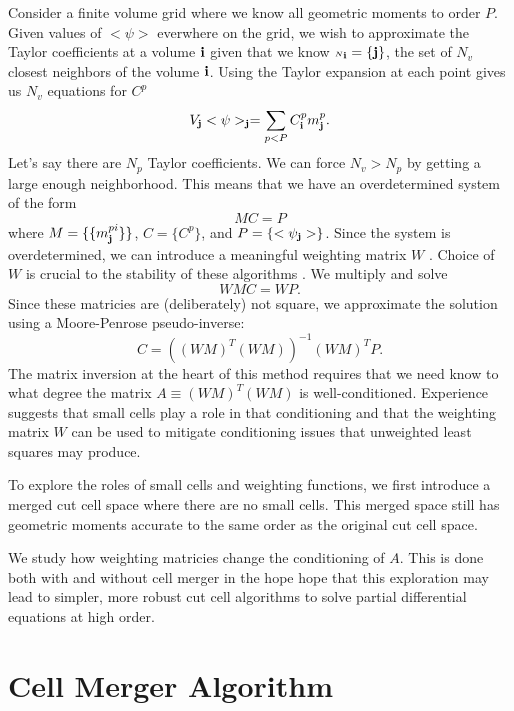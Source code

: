 \documentclass{article}
\newcommand{\ibold}{{\bf i}}
\newcommand{\jbold}{{\bf j}}
\newcommand{\cn}{{\scriptscriptstyle N}}
\begin{document}
Consider a finite volume grid where we know all geometric moments to
order $P$.  Given values of $<\psi>$ everwhere on the grid, we wish to
approximate the Taylor coefficients at a volume $\ibold$ given that we
know $\cn_\ibold = \{\jbold\}$, the set of $N_v$ closest neighbors of
the volume $\ibold$.  Using the Taylor expansion at each point gives
us $N_v$ equations for $C^p$
\begin{equation}
  V_\jbold <\psi>_\jbold = \sum\limits_{p < P} C^p_\ibold m^p_\jbold.
\end{equation}
Let's say there are $N_p$ Taylor coefficients.  We can force $N_v >
N_p$ by getting a large enough neighborhood.  This means that we have
an overdetermined system of the form
\begin{equation*}
M C = P 
\end{equation*}
where $M = \{\{m^{pi}_\jbold\}\}$, $C=\{C^p\}$,  and $P= \{<\psi_\jbold>\}$.
Since the system is overdetermined, we can introduce a 
meaningful weighting matrix $W$ \footnotemark[3].  Choice of $W$
is crucial to the stability of these algorithms
\footnotemark[4].
We multiply and solve
\begin{equation*}
WMC = WP.
\end{equation*}
Since these matricies are (deliberately) not square, we approximate
the solution using a Moore-Penrose pseudo-inverse:
\begin{equation*}
C = ((WM)^T(WM))^{-1} (WM)^T P.
\end{equation*}
The matrix inversion at the heart of this method requires that we need
know to what degree the matrix $A \equiv (WM)^T(WM)$ is
well-conditioned.  Experience suggests that small cells play a role in
that conditioning and that the weighting matrix $W$ can be used to
mitigate conditioning issues that unweighted least squares may
produce.

To explore the roles of small cells and weighting functions, we first
introduce a merged cut cell space where there are no small cells.
This merged space still has geometric moments accurate to the same order 
as the original cut cell space.

We study how weighting matricies change the conditioning of $A$.  This is
done both with and without cell merger in the hope hope that this
exploration may lead to simpler, more robust cut cell algorithms to
solve partial differential equations at high order.

\section{Cell Merger Algorithm}
\end{document}
